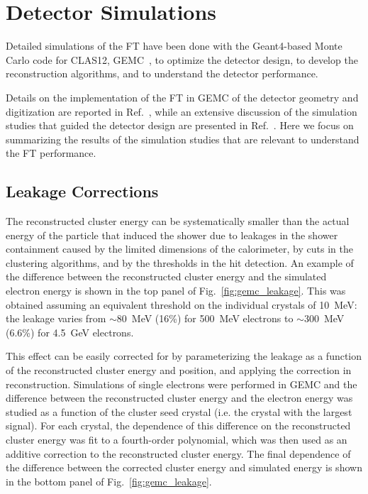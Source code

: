 \section{Detector Simulations}

Detailed simulations of the FT have been done with the Geant4-based Monte Carlo code for CLAS12,
GEMC~\cite{gemc}, to optimize the detector design, to develop the reconstruction algorithms, and to understand
the detector performance.

Details on the implementation of the FT in GEMC of the detector geometry and digitization are reported in
Ref.~\cite{gemc}, while an extensive discussion of the simulation studies that guided the detector design are
presented in Ref.~\cite{ft-tdr}. Here we focus on summarizing the results of the simulation studies that are
relevant to understand the FT performance.

\subsection{Leakage Corrections}

The reconstructed cluster energy can be systematically smaller than the actual energy of the particle that
induced the shower due to leakages in the shower containment caused by the limited dimensions of the calorimeter,
by cuts in the clustering algorithms, and by the thresholds in the hit detection. An example of the difference
between the reconstructed cluster energy and the simulated electron energy is shown in the top panel of
Fig.~\ref{fig:gemc_leakage}. This was obtained assuming an equivalent threshold on  the individual crystals of
10~MeV: the leakage varies from $\sim$80~MeV (16\%) for 500~MeV electrons to $\sim$300~MeV (6.6\%) for
4.5~GeV electrons.

This effect can be easily corrected for by parameterizing the leakage as a function of the reconstructed cluster
energy and position, and applying the correction in reconstruction. Simulations of single electrons were performed
in GEMC and the difference between the reconstructed cluster energy and the electron energy was studied as a
function of the cluster seed crystal (i.e. the crystal with the largest signal). For each crystal, the dependence of
this difference on the reconstructed cluster energy was fit to a fourth-order polynomial, which was then used as
an additive correction to the reconstructed cluster energy. The final dependence of the difference between the
corrected cluster energy and simulated energy is shown in the bottom panel of Fig.~\ref{fig:gemc_leakage}.

